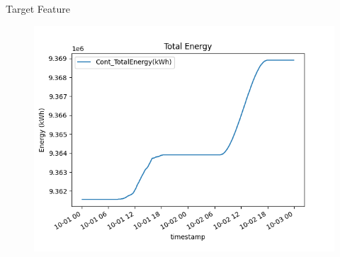 
\begin{frame}{Target Feature}
	\begin{figure}
		\centering
		\includegraphics[width=.9\textwidth]{sections/1_dataset/imgs/totalenergy.png}
	\end{figure}
\end{frame}